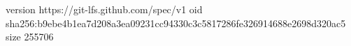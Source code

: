 version https://git-lfs.github.com/spec/v1
oid sha256:b9ebe4b1ea7d208a3ea09231cc94330c3c5817286fe326914688e2698d320ac5
size 255706
